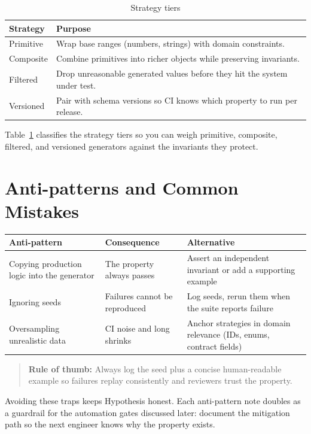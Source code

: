 \begin{table}[h]
\centering
\caption{Strategy tiers}
\label{tab:property-strategies}
\begin{tabular}{p{4cm}p{6cm}}
\toprule
Strategy & Purpose \\
\midrule
Primitive & Wrap base ranges (numbers, strings) with domain constraints. \\
Composite & Combine primitives into richer objects while preserving invariants. \\
Filtered & Drop unreasonable generated values before they hit the system under test. \\
Versioned & Pair with schema versions so CI knows which property to run per release. \\
\bottomrule
\end{tabular}
\end{table}

Table~\ref{tab:property-strategies} classifies the strategy tiers so you can weigh primitive, composite, filtered, and versioned generators against the invariants they protect.

\section{Anti-patterns and Common Mistakes}
\begin{tabular}{p{5cm}p{4cm}p{4cm}}
\toprule
Anti-pattern & Consequence & Alternative \\
\midrule
Copying production logic into the generator & The property always passes & Assert an independent invariant or add a supporting example \\
Ignoring seeds & Failures cannot be reproduced & Log seeds, rerun them when the suite reports failure \\
Oversampling unrealistic data & CI noise and long shrinks & Anchor strategies in domain relevance (IDs, enums, contract fields) \\
\bottomrule
\end{tabular}

\begin{quote}
\textbf{Rule of thumb:} Always log the seed plus a concise human-readable example so failures replay consistently and reviewers trust the property.
\end{quote}

Avoiding these traps keeps Hypothesis honest. Each anti-pattern note doubles as a guardrail for the automation gates discussed later: document the mitigation path so the next engineer knows why the property exists.

